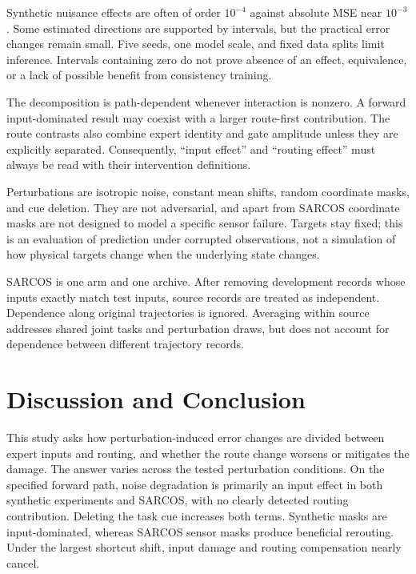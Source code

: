 \documentclass[10pt,letterpaper]{article}
\begin{document}
Synthetic nuisance effects are often of order $10^{-4}$ against absolute MSE near $10^{-3}$. Some estimated directions are supported by intervals, but the practical error changes remain small. Five seeds, one model scale, and fixed data splits limit inference. Intervals containing zero do not prove absence of an effect, equivalence, or a lack of possible benefit from consistency training.


The decomposition is path-dependent whenever interaction is nonzero. A forward input-dominated result may coexist with a larger route-first contribution. The route contrasts also combine expert identity and gate amplitude unless they are explicitly separated. Consequently, ``input effect'' and ``routing effect'' must always be read with their intervention definitions.


Perturbations are isotropic noise, constant mean shifts, random coordinate masks, and cue deletion. They are not adversarial, and apart from SARCOS coordinate masks are not designed to model a specific sensor failure. Targets stay fixed; this is an evaluation of prediction under corrupted observations, not a simulation of how physical targets change when the underlying state changes.


SARCOS is one arm and one archive. After removing development records whose inputs exactly match test inputs, source records are treated as independent. Dependence along original trajectories is ignored. Averaging within source addresses shared joint tasks and perturbation draws, but does not account for dependence between different trajectory records.


\FloatBarrier

\section{Discussion and Conclusion}

This study asks how perturbation-induced error changes are divided between expert inputs and routing, and whether the route change worsens or mitigates the damage. The answer varies across the tested perturbation conditions. On the specified forward path, noise degradation is primarily an input effect in both synthetic experiments and SARCOS, with no clearly detected routing contribution. Deleting the task cue increases both terms. Synthetic masks are input-dominated, whereas SARCOS sensor masks produce beneficial rerouting. Under the largest shortcut shift, input damage and routing compensation nearly cancel.
\end{document}
